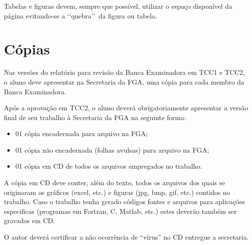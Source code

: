 Tabelas e figuras devem, sempre que possível, utilizar o espaço disponível 
da página evitando-se a \lq\lq quebra\rq\rq\ da figura ou tabela. 

\section{Cópias}

Nas versões do relatório para revisão da Banca Examinadora em TCC1 e TCC2, 
o aluno deve apresentar na Secretaria da FGA, uma cópia para cada membro da 
Banca Examinadora.

Após a aprovação em TCC2, o aluno deverá obrigatoriamente apresentar a 
versão final de seu trabalho à Secretaria da FGA na seguinte forma:

\begin{itemize}
	\item 01 cópia encadernada para arquivo na FGA;
	\item 01 cópia não encadernada (folhas avulsas) para arquivo na FGA;
	\item 01 cópia em CD de todos os arquivos empregados no trabalho.
\end{itemize}

A cópia em CD deve conter, além do texto, todos os arquivos dos quais se 
originaram os gráficos (excel, etc.) e figuras (jpg, bmp, gif, etc.) 
contidos no trabalho. Caso o trabalho tenha gerado códigos fontes e 
arquivos para aplicações especificas (programas em Fortran, C, Matlab, 
etc.) estes deverão também ser gravados em CD. 

O autor deverá certificar a não ocorrência de “vírus” no CD entregue a 
secretaria. 

